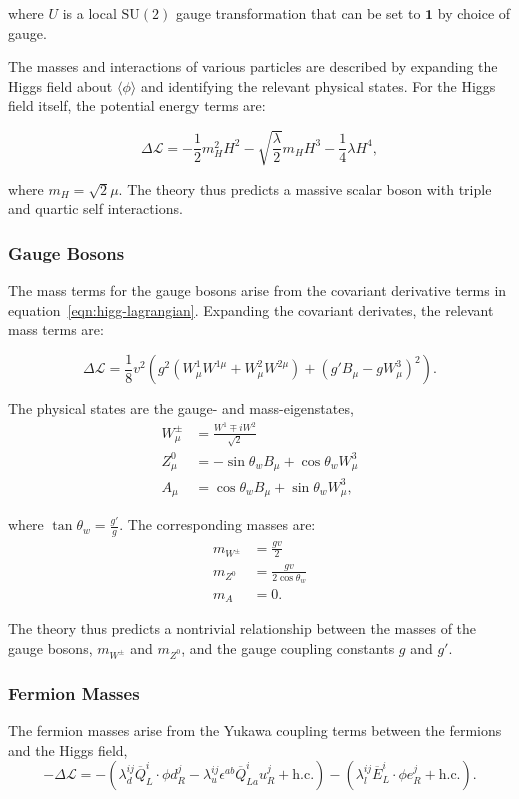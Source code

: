 where $U$ is a local $\mathrm{SU}(2)$ gauge transformation that can be set to $\mathbf{1}$ by choice of gauge. 

The masses and interactions of various particles are described by expanding the Higgs field about $\langle \phi \rangle$ and identifying the relevant physical states. For the Higgs field itself, the potential energy terms are:

\begin{equation}
	\Delta \mathcal{L} = -\frac12 m_H^2 H^2 - \sqrt{\frac{\lambda}{2}} m_H H^3 - \frac14 \lambda H^4,
\end{equation}

 where $m_H=\sqrt{2}\mu$. The theory thus predicts a massive scalar boson with triple and quartic self interactions.


\subsubsection{Gauge Bosons}
The mass terms for the gauge bosons arise from the covariant derivative terms in equation~\ref{eqn:higg-lagrangian}. Expanding the covariant derivates, the relevant mass terms are:

\begin{equation}
	\Delta\mathcal{L} = \frac{1}{8} v^2 \left( g^2 (W^1_{\mu}W^{1\mu} + W^2_{\mu}W^{2\mu}) + (g'B_{\mu} - gW^3_{\mu})^2 \right).
\end{equation}

The physical states are the gauge- and mass-eigenstates,
\begin{align}
	W^{\pm}_{\mu} &= \frac{W^1 \mp iW^2}{\sqrt{2}} \\
	Z^0_{\mu} &= -\sin\theta_w B_{\mu} + \cos\theta_w W_{\mu}^3 \\
	A_{\mu} &= \cos\theta_w B_{\mu} + \sin\theta_w W_{\mu}^3,
\end{align}

where $\tan\theta_w = \frac{g'}{g}$. The corresponding masses are:
\begin{align}
	m_{W^{\pm}} &= \frac{gv}{2} \\
	m_{Z^0} &= \frac{gv}{2\cos\theta_w} \\
	m_{A} &= 0.
\end{align}

The theory thus predicts a nontrivial relationship between the masses of the gauge bosons, $m_{W^{\pm}}$ and $m_{Z^0}$, and the gauge coupling constants $g$ and $g'$.

\subsubsection{Fermion Masses}\label{sec:standard-model-fermion-masses}
The fermion masses arise from the Yukawa coupling terms between the fermions and the Higgs field,
\begin{equation}\label{eqn:lagrangian-yukawa-couplings}
	-\Delta \mathcal{L} = - \left(\lambda_d^{ij} \overline{Q}_L^i \cdot \phi d_R^j - \lambda_u^{ij} \epsilon^{ab}\overline{Q}^i_{La} u_R^j + \mathrm{h.c.}\right) - \left(\lambda_l^{ij} \overline{E}^i_L \cdot \phi e_R^j + \mathrm{h.c.}\right).
\end{equation}
 
